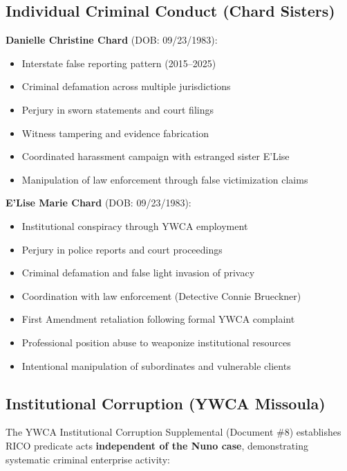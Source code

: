 \documentclass[12pt,oneside]{article}
\begin{document}
\subsection*{Individual Criminal Conduct (Chard Sisters)}

\textbf{Danielle Christine Chard} (DOB: 09/23/1983):
\begin{itemize}
\item Interstate false reporting pattern (2015--2025)
\item Criminal defamation across multiple jurisdictions
\item Perjury in sworn statements and court filings
\item Witness tampering and evidence fabrication
\item Coordinated harassment campaign with estranged sister E'Lise
\item Manipulation of law enforcement through false victimization claims
\end{itemize}

\textbf{E'Lise Marie Chard} (DOB: 09/23/1983):
\begin{itemize}
\item Institutional conspiracy through YWCA employment
\item Perjury in police reports and court proceedings
\item Criminal defamation and false light invasion of privacy
\item Coordination with law enforcement (Detective Connie Brueckner)
\item First Amendment retaliation following formal YWCA complaint
\item Professional position abuse to weaponize institutional resources
\item Intentional manipulation of subordinates and vulnerable clients
\end{itemize}

\subsection*{Institutional Corruption (YWCA Missoula)}

The YWCA Institutional Corruption Supplemental (Document \#8) establishes RICO predicate acts \textbf{independent of the Nuno case}, demonstrating systematic criminal enterprise activity:
\end{document}
